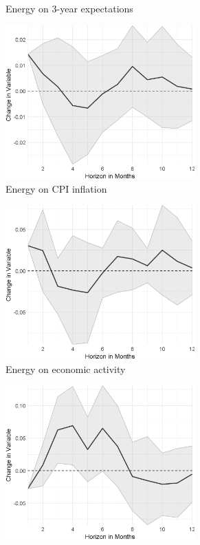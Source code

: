 \begin{figure}
\begin{subfigure}{00.24\textwidth}
		\caption{Energy on 3-year expectations}
	\end{subfigure}
	\begin{subfigure}{00.24\textwidth}
		\includegraphics[width=0.8\textwidth]{output/lp/baseline/bHP/energy/energyoninflation_djn.eps}
		\caption{Energy on CPI inflation}
	\end{subfigure}
	\begin{subfigure}{00.24\textwidth}
		\includegraphics[width=0.8\textwidth]{output/lp/baseline/bHP/energy/energyoneconac_djn.eps}
		\caption{Energy on economic activity}
	\end{subfigure}
	\begin{subfigure}{00.24\textwidth}
		\includegraphics[width=0.8\textwidth]{output/lp/baseline/bHP/labor_shortage/labor_shortageonexpectations1y_djn.eps}

\end{subfigure}
\end{figure}
